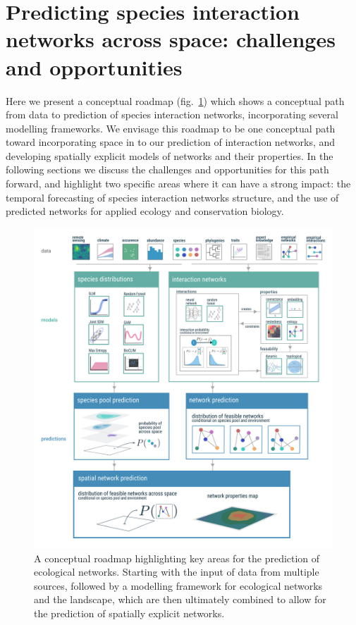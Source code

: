 \documentclass[11pt]{article}
\makeatletter
\def\maxwidth{\ifdim\Gin@nat@width>\linewidth\linewidth
\else\Gin@nat@width\fi}
\let\Oldincludegraphics\includegraphics
\renewcommand{\includegraphics}[1]{\Oldincludegraphics[width=\maxwidth]{#1}}
\makeatother
\begin{document}
\hypertarget{predicting-species-interaction-networks-across-space-challenges-and-opportunities}{%
\section{Predicting species interaction networks across space:
challenges and
opportunities}\label{predicting-species-interaction-networks-across-space-challenges-and-opportunities}}

Here we present a conceptual roadmap (fig.~\ref{fig:conceptual}) which
shows a conceptual path from data to prediction of species interaction
networks, incorporating several modelling frameworks. We envisage this
roadmap to be one conceptual path toward incorporating space in to our
prediction of interaction networks, and developing spatially explicit
models of networks and their properties. In the following sections we
discuss the challenges and opportunities for this path forward, and
highlight two specific areas where it can have a strong impact: the
temporal forecasting of species interaction networks structure, and the
use of predicted networks for applied ecology and conservation biology.

\begin{figure}
\hypertarget{fig:conceptual}{%
\centering
\includegraphics{figures/concept_v6.png}
\caption{A conceptual roadmap highlighting key areas for the prediction
of ecological networks. Starting with the input of data from multiple
sources, followed by a modelling framework for ecological networks and
the landscape, which are then ultimately combined to allow for the
prediction of spatially explicit networks.}\label{fig:conceptual}
}
\end{figure}
\end{document}
